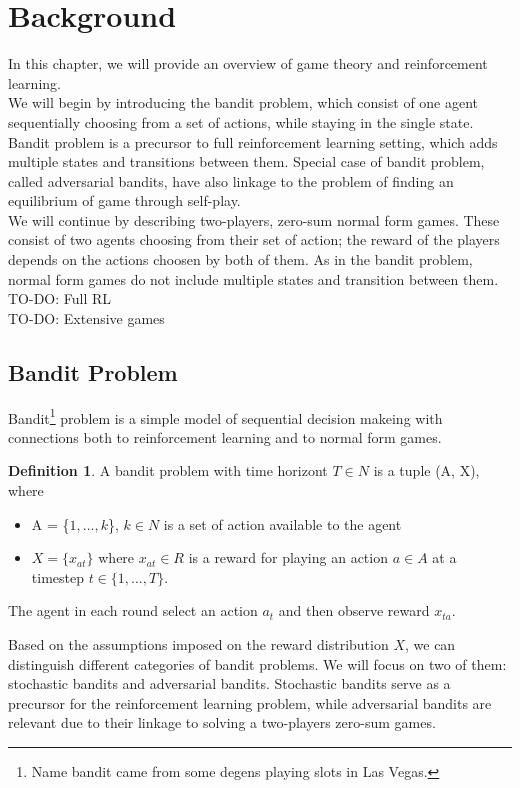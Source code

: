 \documentclass{article}
\theoremstyle{remark}
\theoremstyle{definition}
\newtheorem{definition}{Definition}[section]
\begin{document}
\section{Background}
In this chapter, we will provide an overview of game theory and reinforcement learning. \\ We will begin by introducing the bandit problem, which consist of one agent sequentially choosing from a set of actions, while staying in the single state. Bandit problem is a precursor to full reinforcement learning setting, which adds multiple states and transitions between them. Special case of bandit problem, called adversarial bandits, have also linkage to the problem of finding an equilibrium of game through self-play.
\\We will continue by describing two-players, zero-sum normal form games. These consist of two agents choosing from their set of action; the reward of the players depends on the actions choosen by both of them. As in the bandit problem, normal form games do not include multiple states and transition between them. 
\\TO-DO: Full RL
\\TO-DO: Extensive games

\subsection{Bandit Problem}
Bandit\footnote{Name bandit came from some degens playing slots in Las Vegas.} problem is a simple model of sequential decision makeing with connections both to reinforcement learning and to normal form games.
\begin{definition}
A bandit problem with time horizont $T \in N$ is a tuple (A, X), where
\begin{itemize}
	\item A = \{$1,...,k$\}, $k \in N$ is a set of action available to the agent
	\item $X = \{x_{at}\}$ where $x_{at} \in R$ is a reward for playing an action $a \in A$ at a timestep $t \in \{1,...,T\}$.
\end{itemize}
The agent in each round select an action $a_t$ and then observe reward $x_{ta}$.
\end{definition}
Based on the assumptions imposed on the reward distribution $X$, we can distinguish different categories of bandit problems. We will focus on two of them: stochastic bandits and adversarial bandits. Stochastic bandits serve as a precursor for the reinforcement learning problem, while adversarial bandits are relevant due to their linkage to solving a two-players zero-sum games.
\end{document}
